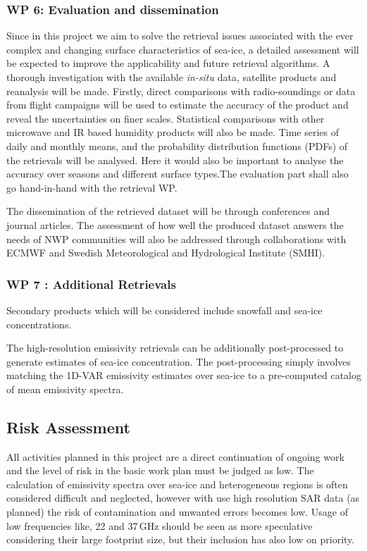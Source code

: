 \documentclass[12pt,oneside,a4paper]{article}
\begin{document}
\subsubsection*{WP 6: Evaluation and dissemination}
%
\label{sec:evaluation}
Since in this project we aim to solve the retrieval issues associated with the ever complex and changing surface characteristics of sea-ice, a detailed assessment will be expected to improve the applicability and future retrieval algorithms. A thorough investigation with the available \textit{in-situ} data, satellite products and reanalysis will be made. Firstly, direct comparisons with radio-soundings or data from flight campaigns will be used to estimate the accuracy of the product and reveal the uncertainties on finer scales. Statistical comparisons with other microwave and IR based humidity products  will also be made. Time series of daily and monthly means, and the probability distribution functions (PDFs) of the retrievals will be analysed. Here it would also be important to analyse the accuracy over seasons and different surface types.The evaluation part shall also go hand-in-hand with the retrieval WP.

The dissemination of the retrieved dataset will be through conferences and journal articles. The assessment of how well the produced dataset answers the needs of NWP communities will also be addressed through collaborations with ECMWF and Swedish Meteorological and Hydrological Institute (SMHI). 
\vspace{-1.0ex}
\subsubsection*{WP 7 : Additional Retrievals}
%
\label{sec:other_retrievals}

Secondary products which will be considered include snowfall and sea-ice concentrations.  


The high-resolution emissivity retrievals can be additionally post-processed to generate estimates of sea-ice concentration. The post-processing simply involves matching the 1D-VAR emissivity estimates over sea-ice to a pre-computed catalog of mean emissivity spectra. %

 
\subsection{Risk Assessment}
%
\label{sec:risk}
All activities planned in this project are a direct continuation of ongoing
work and the level of risk in the basic work plan must be judged as low. The
calculation of emissivity spectra over sea-ice and heterogeneous regions is
often considered difficult and neglected, however with use high resolution SAR
data (as planned) the risk of contamination and unwanted errors becomes low.
Usage of low frequencies like, 22 and 37\,GHz should be seen as more
speculative considering their large footprint size, but their inclusion has
also low on priority.
\end{document}
